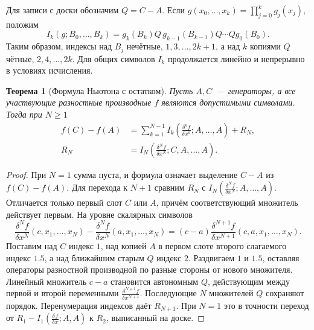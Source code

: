 \documentclass[11pt,a4paper]{article}
\theoremstyle{plain}
\newtheorem{theorem}{Теорема}[section]
\theoremstyle{definition}
\newcommand{\ddiff}[2][]{\frac{\delta^{#1}#2}{\delta x^{#1}}}
\begin{document}
Для записи с доски обозначим $Q=C-A$. Если
$g(x_0,\ldots,x_k)=\prod_{j=0}^k g_j(x_j)$, положим
\[
 I_k(g;B_0,\ldots,B_k)
 =g_k(B_k)Q\,g_{k-1}(B_{k-1})Q\cdots Qg_0(B_0).
\]
Таким образом, индексы над $B_j$ нечётные,
$1,3,\ldots,2k+1$, а над $k$ копиями $Q$ чётные,
$2,4,\ldots,2k$. Для общих символов $I_k$ продолжается
линейно и непрерывно в условиях исчисления.

\begin{theorem}[Формула Ньютона с остатком]
Пусть $A,C$~--- генераторы, а все участвующие разностные
производные $f$ являются допустимыми символами. Тогда при
$N\ge1$
\[
 \begin{aligned}
 f(C)-f(A)
 &=\sum_{k=1}^{N-1}I_k(\ddiff[k]{f};A,\ldots,A)+R_N,\\
 R_N&=I_N(\ddiff[N]{f};C,A,\ldots,A).
 \end{aligned}
\]
\end{theorem}
\begin{proof}
При $N=1$ сумма пуста, и формула означает выделение
$C-A$ из $f(C)-f(A)$. Для перехода к $N+1$ сравним
$R_N$ с $I_N(\ddiff[N]{f};A,\ldots,A)$. Отличается только первый
слот $C$ или $A$, причём соответствующий множитель
действует первым. На уровне скалярных символов
\[
 \ddiff[N]{f}(c,x_1,\ldots,x_N)-\ddiff[N]{f}(a,x_1,\ldots,x_N)
   =(c-a)\ddiff[N+1]{f}(c,a,x_1,\ldots,x_N).
\]
Поставим над $C$ индекс $1$, над копией $A$ в первом
слоте второго слагаемого индекс $1.5$, а над ближайшим
старым $Q$ индекс $2$. Раздвигаем $1$ и $1.5$, оставляя
операторы разностной производной по разные стороны от
нового множителя. Линейный множитель $c-a$ становится
автономным $Q$, действующим между первой и второй
переменными $\ddiff[N+1]{f}$. Последующие $N$ множителей $Q$
сохраняют порядок. Перенумерация индексов даёт $R_{N+1}$.
При $N=1$ это в точности переход от
$R_1-I_1(\ddiff{f};A,A)$ к $R_2$, выписанный на доске.
\end{proof}
\end{document}
